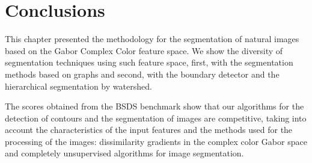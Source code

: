 

\section{Conclusions}

This chapter presented the methodology for the segmentation of natural images based on the Gabor Complex Color feature space. We show the diversity of segmentation techniques using such feature space, first, with the segmentation methods based on graphs and second, with the boundary detector and the hierarchical segmentation by watershed.

The scores obtained from the BSDS benchmark show that our algorithms for the detection of contours and the segmentation of images are competitive, taking into account the characteristics of the input features and the methods used for the processing of the images: dissimilarity gradients in the complex color Gabor space and completely unsupervised algorithms for image segmentation.
